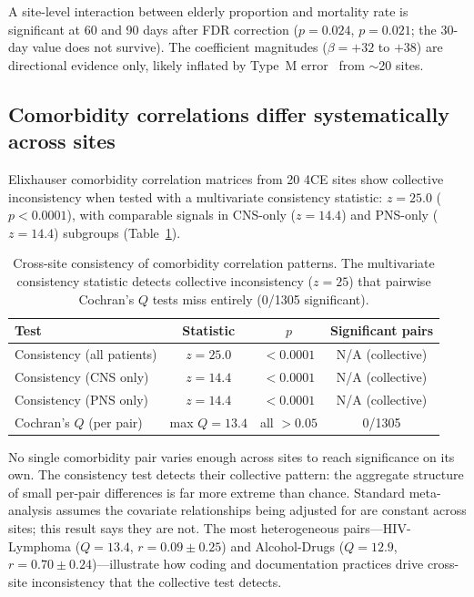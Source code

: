 \documentclass[11pt]{article}
\begin{document}
A site-level interaction between elderly proportion and mortality rate is
significant at 60 and 90 days after FDR correction ($p = 0.024$, $p = 0.021$;
the 30-day value does not survive).  The coefficient magnitudes
($\beta = +32$ to $+38$) are directional evidence only, likely inflated
by Type~M error~\cite{gelman2014typeMS} from $\sim$20 sites.


\subsection{Comorbidity correlations differ systematically across sites}

Elixhauser comorbidity correlation matrices \cite{elixhauser1998} from 20
4CE sites show collective inconsistency when tested with a multivariate
consistency statistic: $z = 25.0$ ($p < 0.0001$), with comparable signals
in CNS-only ($z = 14.4$) and PNS-only ($z = 14.4$) subgroups
(Table~\ref{tab:consistency}).

\begin{table}[t]
\centering
\caption{Cross-site consistency of comorbidity correlation patterns.  The
multivariate consistency statistic detects collective inconsistency
($z = 25$) that pairwise Cochran's $Q$ tests miss entirely (0/1305
significant).}
\label{tab:consistency}
\begin{tabular}{lccc}
\toprule
Test & Statistic & $p$ & Significant pairs \\
\midrule
Consistency (all patients) & $z = 25.0$ & $< 0.0001$ & N/A (collective) \\
Consistency (CNS only) & $z = 14.4$ & $< 0.0001$ & N/A (collective) \\
Consistency (PNS only) & $z = 14.4$ & $< 0.0001$ & N/A (collective) \\
Cochran's $Q$ (per pair) & max $Q = 13.4$ & all $> 0.05$ & 0/1305 \\
\bottomrule
\end{tabular}
\end{table}

No single comorbidity pair varies enough across sites to reach significance
on its own.  The consistency test detects their collective pattern: the
aggregate structure of small per-pair differences is far more extreme than
chance.  Standard meta-analysis assumes the covariate relationships being
adjusted for are constant across sites; this result says they are not.  The most
heterogeneous pairs---HIV-Lymphoma ($Q = 13.4$, $r = 0.09 \pm 0.25$) and
Alcohol-Drugs ($Q = 12.9$, $r = 0.70 \pm 0.24$)---illustrate how coding
and documentation practices drive cross-site inconsistency that the
collective test detects.
\end{document}

